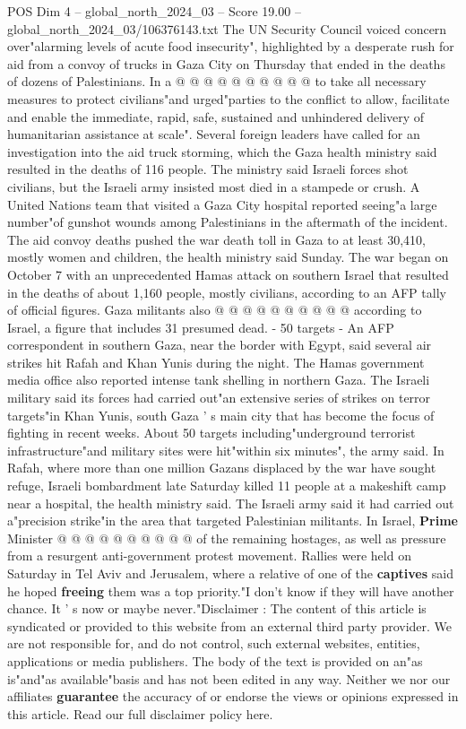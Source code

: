\begin{textsample}{POS Dim 4 – global\_north\_2024\_03 – Score 19.00 – global\_north\_2024\_03/106376143.txt}
The UN Security Council voiced concern over"alarming levels of acute food insecurity", highlighted by a desperate rush for aid from a convoy of trucks in Gaza City on Thursday that ended in the deaths of dozens of Palestinians.
In a @ @ @ @ @ @ @ @ @ @ to take all necessary measures to protect civilians"and urged"parties to the conflict to allow, facilitate and enable the immediate, rapid, safe, sustained and unhindered delivery of humanitarian assistance at scale".
Several foreign leaders have called for an investigation into the aid truck storming, which the Gaza health ministry said resulted in the deaths of 116 people.
The ministry said Israeli forces shot civilians, but the Israeli army insisted most died in a stampede or crush.
A United Nations team that visited a Gaza City hospital reported seeing"a large number"of gunshot wounds among Palestinians in the aftermath of the incident.
The aid convoy deaths pushed the war death toll in Gaza to at least 30,410, mostly women and children, the health ministry said Sunday.
The war began on October 7 with an unprecedented Hamas attack on southern Israel that resulted in the deaths of about 1,160 people, mostly civilians, according to an AFP tally of official figures.
Gaza militants also @ @ @ @ @ @ @ @ @ @ according to Israel, a figure that includes 31 presumed dead. - 50 targets - An AFP correspondent in southern Gaza, near the border with Egypt, said several air strikes hit Rafah and Khan Yunis during the night.
The Hamas government media office also reported intense tank shelling in northern Gaza.
The Israeli military said its forces had carried out"an extensive series of strikes on terror targets"in Khan Yunis, south Gaza ' s main city that has become the focus of fighting in recent weeks.
About 50 targets including"underground terrorist infrastructure"and military sites were hit"within six minutes", the army said.
In Rafah, where more than one million Gazans displaced by the war have sought refuge, Israeli bombardment late Saturday killed 11 people at a makeshift camp near a hospital, the health ministry said.
The Israeli army said it had carried out a"precision strike"in the area that targeted Palestinian militants.
In Israel, \textbf{Prime} Minister @ @ @ @ @ @ @ @ @ @ of the remaining hostages, as well as pressure from a resurgent anti-government protest movement.
Rallies were held on Saturday in Tel Aviv and Jerusalem, where a relative of one of the \textbf{captives} said he hoped \textbf{freeing} them was a top priority."I don't know if they will have another chance.
It ' s now or maybe never."Disclaimer : The content of this article is syndicated or provided to this website from an external third party provider.
We are not responsible for, and do not control, such external websites, entities, applications or media publishers.
The body of the text is provided on an"as is"and"as available"basis and has not been edited in any way.
Neither we nor our affiliates \textbf{guarantee} the accuracy of or endorse the views or opinions expressed in this article.
Read our full disclaimer policy here.


\end{textsample}
